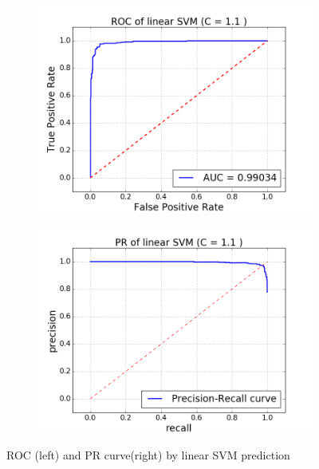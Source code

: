 \documentclass{article}
\begin{document}
\begin{singlespacing}
\begin{figure}[H]
    \centering
    \begin{subfigure}[b]{0.4\textwidth}
        \includegraphics[width=\textwidth]{lsvm_roc.png}
    \end{subfigure}
    \begin{subfigure}[b]{0.4\textwidth}
        \includegraphics[width=\textwidth]{lsvm_pr.png}
    \end{subfigure}
    \caption{ROC (left) and PR curve(right) by linear SVM prediction}\label{fig:lsvm}
\end{figure}


\end{singlespacing}
\end{document}
